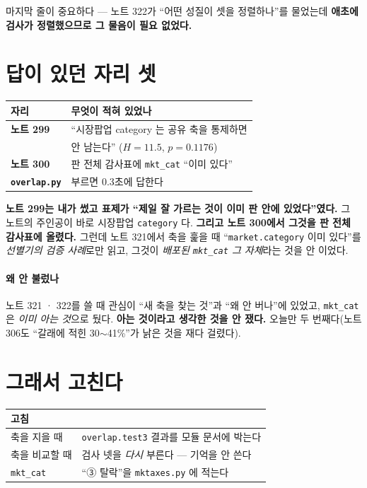 \documentclass[10pt]{article}
\begin{document}
마지막 줄이 중요하다 --- 노트 322가 ``어떤 성질이 셋을 정렬하나''를 물었는데
\textbf{애초에 검사가 정렬했으므로 그 물음이 필요 없었다.}

\section{답이 있던 자리 셋}

\begin{center}\footnotesize
\begin{tabular}{ll}
\hline
자리 & 무엇이 적혀 있었나 \\
\hline
\textbf{노트 299} & ``시장팝업 category 는 공유 축을 통제하면 \\
 & 안 남는다'' ($H{=}11.5$, $p{=}0.1176$) \\
\textbf{노트 300} & 판 전체 감사표에 \texttt{mkt\_cat} ``이미 있다'' \\
\textbf{\texttt{overlap.py}} & 부르면 0.3초에 답한다 \\
\hline
\end{tabular}
\end{center}

\textbf{노트 299는 내가 썼고 표제가 ``제일 잘 가르는 것이 이미 판 안에
있었다''였다.} 그 노트의 주인공이 바로 시장팝업 \texttt{category} 다.
\textbf{그리고 노트 300에서 그것을 판 전체 감사표에 올렸다.} 그런데 노트
321에서 축을 훑을 때 ``\texttt{market.category} 이미 있다''를
\emph{선별기의 검증 사례}로만 읽고, 그것이 \emph{배포된 \texttt{mkt\_cat}
그 자체}라는 것을 안 이었다.

\paragraph{왜 안 불렀나} 노트 321 · 322를 쓸 때 관심이 ``새 축을 찾는 것''과
``왜 안 버나''에 있었고, \texttt{mkt\_cat} 은 \emph{이미 아는 것}으로 뒀다.
\textbf{아는 것이라고 생각한 것을 안 쟀다.} 오늘만 두 번째다(노트 306도
``갈래에 적힌 30$\sim$41\%''가 낡은 것을 재다 걸렸다).

\section{그래서 고친다}

\begin{center}\footnotesize
\begin{tabular}{ll}
\hline
고침 & \\
\hline
축을 지을 때 & \texttt{overlap.test3} 결과를 모듈 문서에 박는다 \\
축을 비교할 때 & 검사 넷을 \emph{다시} 부른다 --- 기억을 안 쓴다 \\
\texttt{mkt\_cat} & ``③ 탈락''을 \texttt{mktaxes.py} 에 적는다 \\
\hline
\end{tabular}
\end{center}
\end{document}
